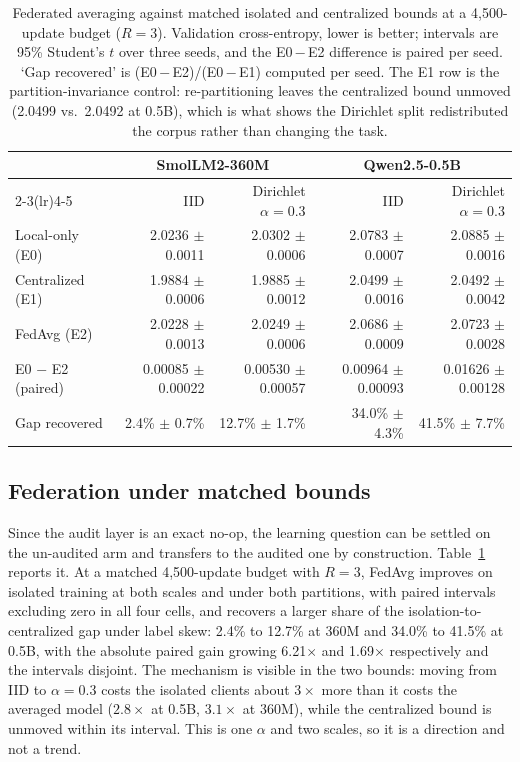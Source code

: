\documentclass[11pt]{article}
\begin{document}
\begin{table}[t]
\centering
\small
\setlength{\tabcolsep}{4pt}
\begin{tabular}{lrrrr}
\toprule
 & \multicolumn{2}{c}{\textbf{SmolLM2-360M}} & \multicolumn{2}{c}{\textbf{Qwen2.5-0.5B}} \\
\cmidrule(lr){2-3}\cmidrule(lr){4-5}
 & IID & Dirichlet $\alpha{=}0.3$ & IID & Dirichlet $\alpha{=}0.3$ \\
\midrule
Local-only (E0)  & 2.0236 $\pm$ 0.0011 & 2.0302 $\pm$ 0.0006 & 2.0783 $\pm$ 0.0007 & 2.0885 $\pm$ 0.0016 \\
Centralized (E1) & 1.9884 $\pm$ 0.0006 & 1.9885 $\pm$ 0.0012 & 2.0499 $\pm$ 0.0016 & 2.0492 $\pm$ 0.0042 \\
FedAvg (E2)      & 2.0228 $\pm$ 0.0013 & 2.0249 $\pm$ 0.0006 & 2.0686 $\pm$ 0.0009 & 2.0723 $\pm$ 0.0028 \\
\midrule
E0 $-$ E2 (paired) & 0.00085 $\pm$ 0.00022 & 0.00530 $\pm$ 0.00057 & 0.00964 $\pm$ 0.00093 & 0.01626 $\pm$ 0.00128 \\
Gap recovered      & 2.4\% $\pm$ 0.7\% & 12.7\% $\pm$ 1.7\% & 34.0\% $\pm$ 4.3\% & 41.5\% $\pm$ 7.7\% \\
\bottomrule
\end{tabular}
\caption{Federated averaging against matched isolated and centralized bounds at a 4{,}500-update budget ($R{=}3$). Validation cross-entropy, lower is better; intervals are 95\% Student's $t$ over three seeds, and the E0\,$-$\,E2 difference is paired per seed. `Gap recovered' is (E0\,$-$\,E2)/(E0\,$-$\,E1) computed per seed. The E1 row is the partition-invariance control: re-partitioning leaves the centralized bound unmoved (2.0499 vs.\ 2.0492 at 0.5B), which is what shows the Dirichlet split redistributed the corpus rather than changing the task.}
\label{tab:learning}
\end{table}

\subsection{Federation under matched bounds}
\label{sec:learning}

Since the audit layer is an exact no-op, the learning question can be settled on the un-audited arm and transfers to the audited one by construction. Table~\ref{tab:learning} reports it. At a matched 4,500-update budget with $R{=}3$, FedAvg improves on isolated training at both scales and under both partitions, with paired intervals excluding zero in all four cells, and recovers a larger share of the isolation-to-centralized gap under label skew: 2.4\% to 12.7\% at 360M and 34.0\% to 41.5\% at 0.5B, with the absolute paired gain growing 6.21$\times$ and 1.69$\times$ respectively and the intervals disjoint. The mechanism is visible in the two bounds: moving from IID to $\alpha{=}0.3$ costs the isolated clients about $3\times$ more than it costs the averaged model ($2.8\times$ at 0.5B, $3.1\times$ at 360M), while the centralized bound is unmoved within its interval. This is one $\alpha$ and two scales, so it is a direction and not a trend.
\end{document}
